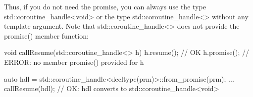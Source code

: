 Thus, if you do not need the promise, you can always use the type std::coroutine\_handle<void> or the type std::coroutine\_handle<> without any template argument. Note that std::coroutine\_handle<> does not provide the promise() member function:

\begin{cpp}
void callResume(std::coroutine_handle<> h)
{
	h.resume(); // OK
	h.promise(); // ERROR: no member promise() provided for h
}

auto hdl = std::coroutine_handle<decltype(prm)>::from_promise(prm);
...
callResume(hdl); // OK: hdl converts to std::coroutine_handle<void>
\end{cpp}








